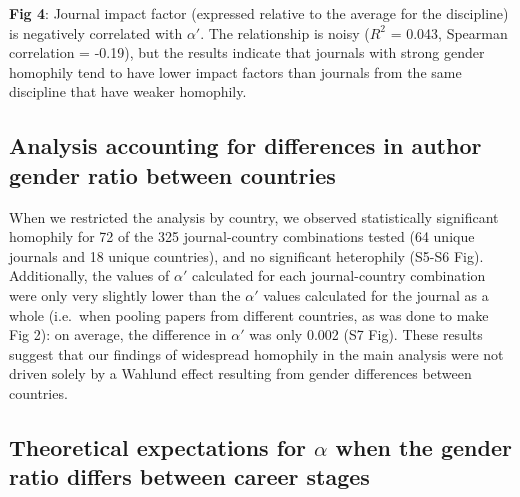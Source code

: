 \documentclass[12pt,]{article}
\begin{document}
\vspace{2cm}

\textbf{Fig 4}: Journal impact factor (expressed relative to the average
for the discipline) is negatively correlated with \(\alpha'\). The
relationship is noisy (\(R^2\) = 0.043, Spearman correlation = -0.19),
but the results indicate that journals with strong gender homophily tend
to have lower impact factors than journals from the same discipline that
have weaker homophily. \vspace{2cm}

\hypertarget{analysis-accounting-for-differences-in-author-gender-ratio-between-countries}{%
\subsection{Analysis accounting for differences in author gender ratio
between
countries}\label{analysis-accounting-for-differences-in-author-gender-ratio-between-countries}}

When we restricted the analysis by country, we observed statistically
significant homophily for 72 of the 325 journal-country combinations
tested (64 unique journals and 18 unique countries), and no significant
heterophily (S5-S6 Fig). Additionally, the values of \(\alpha'\)
calculated for each journal-country combination were only very slightly
lower than the \(\alpha'\) values calculated for the journal as a whole
(i.e.~when pooling papers from different countries, as was done to make
Fig 2): on average, the difference in \(\alpha'\) was only 0.002 (S7
Fig). These results suggest that our findings of widespread homophily in
the main analysis were not driven solely by a Wahlund effect resulting
from gender differences between countries.

\hypertarget{theoretical-expectations-for-alpha-when-the-gender-ratio-differs-between-career-stages}{%
\subsection{\texorpdfstring{Theoretical expectations for \(\alpha\) when
the gender ratio differs between career
stages}{Theoretical expectations for \textbackslash{}alpha when the gender ratio differs between career stages}}\label{theoretical-expectations-for-alpha-when-the-gender-ratio-differs-between-career-stages}}
\end{document}
